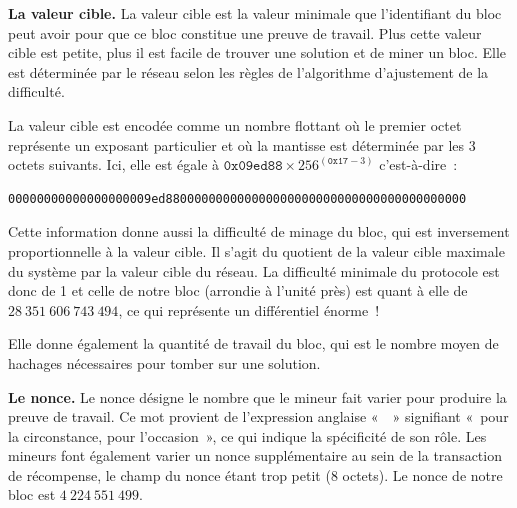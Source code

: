 
\textbf{La valeur cible.} La valeur cible est la valeur minimale que l'identifiant du bloc peut avoir pour que ce bloc constitue une preuve de travail. Plus cette valeur cible est petite, plus il est facile de trouver une solution et de miner un bloc. Elle est déterminée par le réseau selon les règles de l'algorithme d'ajustement de la difficulté.

La valeur cible est encodée comme un nombre flottant où le premier octet représente un exposant particulier et où la mantisse est déterminée par les 3 octets suivants. Ici, elle est égale à $\mathtt{0x09ed88} \times 256^{(\mathtt{0x17} - 3)}$ c'est-à-dire~:

\begin{Verbatim}[fontsize=\footnotesize]
00000000000000000009ed880000000000000000000000000000000000000000
\end{Verbatim}

Cette information donne aussi la difficulté de minage du bloc, qui est inversement proportionnelle à la valeur cible. Il s'agit du quotient de la valeur cible maximale du système par la valeur cible du réseau. La difficulté minimale du protocole est donc de 1 et celle de notre bloc (arrondie à l'unité près) est quant à elle de $28~351~606~743~494$, ce qui représente un différentiel énorme~!

Elle donne également la quantité de travail du bloc, qui est le nombre moyen de hachages nécessaires pour tomber sur une solution.


\textbf{Le nonce.} Le nonce désigne le nombre que le mineur fait varier pour produire la preuve de travail. Ce mot provient de l'expression anglaise «~~» signifiant «~pour la circonstance, pour l'occasion~», ce qui indique la spécificité de son rôle. Les mineurs font également varier un nonce supplémentaire au sein de la transaction de récompense, le champ du nonce étant trop petit (8 octets). Le nonce de notre bloc est $4~224~551~499$.


